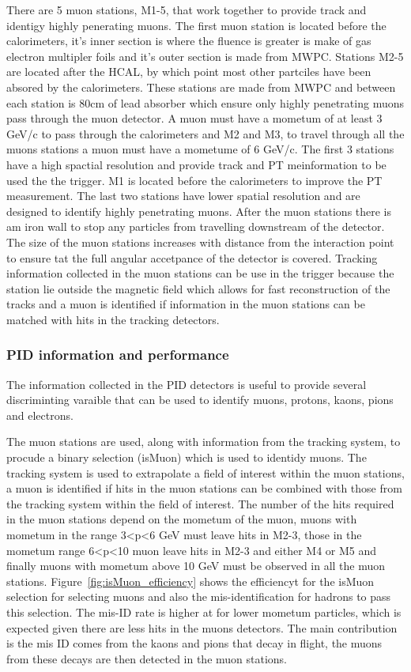 There are 5 muon stations, M1-5, that work together to provide track and identigy highly penerating muons. The first muon station is located before the calorimeters, it's inner section is where the fluence is greater is make of gas electron multipler foils and it's outer section is made from MWPC. Stations M2-5 are located after the HCAL, by which point most other partciles have been absored by the calorimeters. These stations are made from MWPC and between each station is 80cm of lead absorber which ensure only highly penetrating muons pass through the muon detector. A muon must have a mometum of at least 3 GeV/c to pass through the calorimeters and M2 and M3, to travel through all the muons stations a muon must have a mometume of 6 GeV/c. 
The first 3 stations have a high spactial resolution and provide track and PT meinformation to be used the the trigger. M1 is located before the calorimeters to improve the PT measurement. The last two stations have lower spatial resolution and are designed to identify highly penetrating muons. After the muon stations there is am iron wall to stop any particles from travelling downstream of the detector. The size of the muon stations increases with distance from the interaction point to ensure tat the full angular accetpance of the detector is covered. Tracking information collected in the muon stations can be use in the trigger because the station lie outside the magnetic field which allows for fast reconstruction of the tracks and a muon is identified if information in the muon stations can be matched with hits in the tracking detectors. 

\subsubsection{PID information and performance}
\label{PID_variables}

The information collected in the PID detectors is useful to provide several discriminting varaible that can be used to identify muons, protons, kaons, pions and electrons.

The muon stations are used, along with information from the tracking system, to procude a binary selection (isMuon) which is used to identidy muons. The tracking system is used to extrapolate a field of interest within the muon stations, a muon is identified if hits in the muon stations can be combined with those from the tracking system within the field of interest. The number of the hits required in the muon stations depend on the mometum of the muon, muons with mometum in the range 3<p<6 GeV must leave hits in M2-3, those in the  mometum range 6<p<10 muon leave hits in M2-3 and either M4 or M5 and finally muons with mometum above 10 GeV must be observed in all the muon stations. Figure~\ref{fig:isMuon_efficiency} shows the efficiencyt for the isMuon selection for selecting muons and also the mis-identification for hadrons to pass this selection. The mis-ID rate is higher at for lower mometum particles, which is expected given there are less hits in the muons detectors. The main contribution is the mis ID comes from the kaons and pions that decay in flight, the  muons from these decays are then detected in the muon stations.


